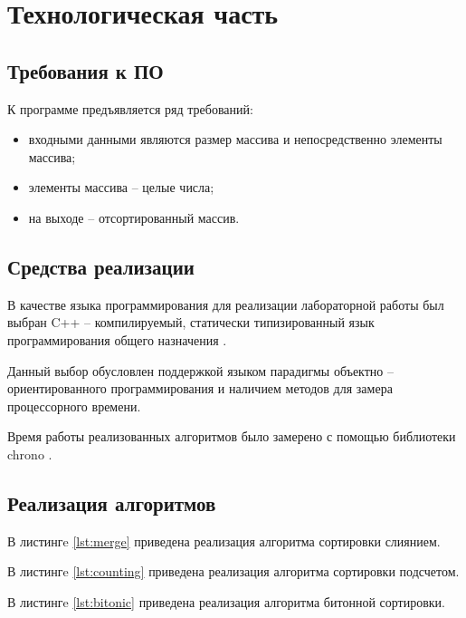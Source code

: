 \chapter{Технологическая часть}

\section{Требования к ПО}

К программе предъявляется ряд требований:
\begin{itemize}
	\item входными данными являются размер массива и непосредственно элементы массива;
	\item элементы массива -- целые числа;
	\item на выходе -- отсортированный массив.
\end{itemize}

\section{Средства реализации}

В качестве языка программирования для реализации лабораторной работы был выбран C++ -- компилируемый, статически типизированный язык программирования общего назначения \cite{cpp}. 

Данный выбор обусловлен поддержкой языком парадигмы объектно -- ориентированного программирования и наличием методов для замера процессорного времени.

Время работы реализованных алгоритмов было замерено с помощью библиотеки chrono \cite{chrono}.

\section{Реализация алгоритмов}

В листингe \ref{lst:merge} приведена реализация алгоритма сортировки слиянием.


В листингe \ref{lst:counting} приведена реализация алгоритма сортировки подсчетом.


В листингe \ref{lst:bitonic} приведена реализация алгоритма битонной сортировки.

